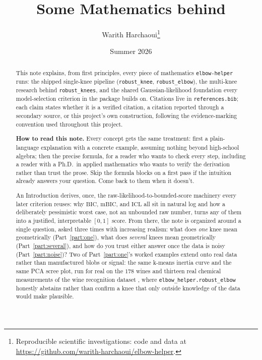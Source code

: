 \documentclass[11pt]{article}
\title{Some Mathematics behind \code{elbow-helper}}
\author{Warith Harchaoui\thanks{Reproducible scientific investigations: code and data at
  \url{https://github.com/warith-harchaoui/elbow-helper}.}}
\date{Summer 2026}
\newcommand{\code}[1]{\texttt{#1}}
\begin{document}
\maketitle

\begin{abstract}
This note explains, from first principles, every piece of mathematics
\code{elbow-helper} runs: the shipped single-knee pipeline
(\code{robust\_knee}, \code{robust\_elbow}), the multi-knee research
behind \code{robust\_knees}, and the shared Gaussian-likelihood
foundation every model-selection criterion in the package builds on.
Citations live in \code{references.bib}; each claim states whether it is
a verified citation, a citation reported through a secondary source, or
this project's own construction, following the evidence-marking
convention used throughout this project.

\textbf{How to read this note.} Every concept gets the same treatment: first
a plain-language explanation with a concrete example, assuming nothing
beyond high-school algebra; then the precise formula, for a reader who wants
to check every step, including a reader with a Ph.D.\ in applied mathematics
who wants to verify the derivation rather than trust the prose. Skip the
formula blocks on a first pass if the intuition already answers your
question. Come back to them when it doesn't.

An Introduction derives, once, the raw-likelihood-to-bounded-score
machinery every later criterion reuses: why $\mathrm{BIC}$, $\mathrm{mBIC}$,
and $\mathrm{ICL}$ all sit in natural log and how a deliberately
pessimistic worst case, not an unbounded raw number, turns any of them
into a justified, interpretable $[0,1]$ score. From there, the note is
organized around a single question, asked three times with increasing
realism: what does \emph{one} knee mean geometrically
(Part~\ref{part:one}), what does \emph{several} knees mean geometrically
(Part~\ref{part:several}), and how do you trust either answer once the data
is noisy (Part~\ref{part:noise})? Two of Part~\ref{part:one}'s worked
examples extend onto real data rather than manufactured blobs or
signal: the same k-means inertia curve and the same PCA scree plot, run
for real on the $178$ wines and thirteen real chemical measurements of
the wine recognition dataset \citep{aeberhard1992}, where
\code{elbow\_helper.robust\_elbow} honestly abstains rather than confirm
a knee that only outside knowledge of the data would make plausible.
\end{abstract}
\end{document}
